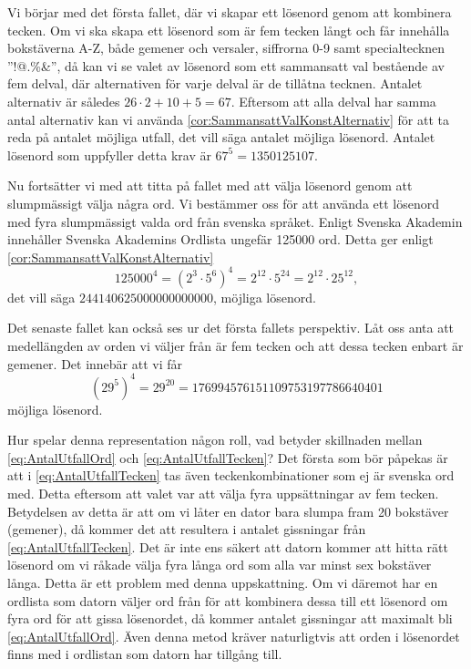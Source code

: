 Vi börjar med det första fallet, där vi skapar ett lösenord genom att kombinera
tecken.
Om vi ska skapa ett lösenord som är fem tecken långt och får innehålla
bokstäverna A-Z, både gemener och versaler,
siffrorna 0-9 samt
specialtecknen ''!@.\%\&'',
då kan vi se valet av lösenord som ett sammansatt val bestående av fem delval,
där alternativen för varje delval är de tillåtna tecknen.
Antalet alternativ är således \(26\cdot 2 + 10 + 5 = 67\).
Eftersom att alla delval har samma antal alternativ kan vi använda
\cref{cor:SammansattValKonstAlternativ} för att ta reda på antalet möjliga
utfall, det vill säga antalet möjliga lösenord.
Antalet lösenord som uppfyller detta krav är \(67^5 = 1350125107\).

Nu fortsätter vi med att titta på fallet med att välja lösenord genom att
slumpmässigt välja några ord.
Vi bestämmer oss för att använda ett lösenord med fyra slumpmässigt valda
ord från svenska språket.
Enligt Svenska Akademin \citep{SAOL} innehåller Svenska Akademins Ordlista
ungefär 125000 ord.
Detta ger enligt \cref{cor:SammansattValKonstAlternativ}
\begin{equation}\label{eq:AntalUtfallOrd}
  125000^4 = (2^3\cdot 5^6)^4
    = 2^{12}\cdot 5^{24}
    = 2^{12}\cdot 25^{12},
\end{equation}
det vill säga \(244140625000000000000\), möjliga lösenord.

Det senaste fallet kan också ses ur det första fallets perspektiv.
Låt oss anta att medellängden av orden vi väljer från är fem tecken och att
dessa tecken enbart är gemener.
Det innebär att vi får
\begin{equation}\label{eq:AntalUtfallTecken}
  (29^5)^4 = 29^{20} = 176994576151109753197786640401
\end{equation}
möjliga lösenord.

Hur spelar denna representation någon roll, vad betyder skillnaden mellan
\cref{eq:AntalUtfallOrd} och \cref{eq:AntalUtfallTecken}?
Det första som bör påpekas är att i \cref{eq:AntalUtfallTecken} tas även
teckenkombinationer som ej är svenska ord med.
Detta eftersom att valet var att välja fyra uppsättningar av fem tecken.
Betydelsen av detta är att om vi låter en dator bara slumpa fram 20 bokstäver
(gemener), då kommer det att resultera i antalet gissningar från
\cref{eq:AntalUtfallTecken}.
Det är inte ens säkert att datorn kommer att hitta rätt lösenord om vi råkade
välja fyra långa ord som alla var minst sex bokstäver långa.
Detta är ett problem med denna uppskattning.
Om vi däremot har en ordlista som datorn väljer ord från för att kombinera
dessa till ett lösenord om fyra ord för att gissa lösenordet, då kommer antalet
gissningar att maximalt bli \cref{eq:AntalUtfallOrd}.
Även denna metod kräver naturligtvis att orden i lösenordet finns med i
ordlistan som datorn har tillgång till.

